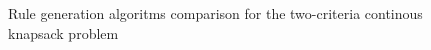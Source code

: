 \begin{figure}
  \centering
  \caption{Rule generation algoritms comparison for the two-criteria continous knapsack problem}
  \label{c2_cont_algo}
\end{figure}

